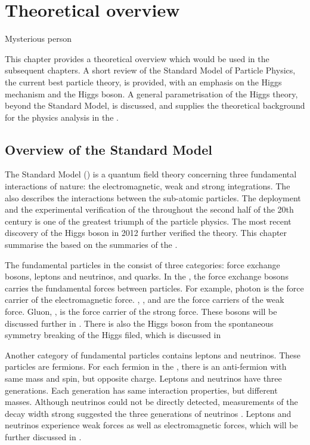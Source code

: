 \chapter{Theoretical overview}
\label{chap:Theory}

%
{Mysterious person}%

This chapter provides a theoretical overview which would be used in the subsequent  chapters. A short review of the Standard Model of Particle Physics, the current best particle theory, is provided, with an emphasis on the Higgs mechanism and the Higgs boson. A general parametrisation of the Higgs theory, beyond the Standard Model, is discussed, and supplies the theoretical background for the physics analysis in the .

\section{Overview of the Standard Model}

The Standard Model (\SM) is a quantum field theory concerning three fundamental interactions of nature: the electromagnetic, weak and strong integrations. The \SM also describes the interactions between the sub-atomic particles. The deployment and the experimental verification of the \SM throughout the second half of the 20th century is one of the greatest triumph of the particle physics. The most recent discovery of the Higgs boson in 2012 \cite{Aad:2012tfa} further verified the theory. This chapter summarise the \SM based on the summaries of the \SM \cite{Agashe:2014kda,Thomson:2013zua,Tong:QFT,Gripaios:GFT}.

The fundamental particles in the \SM consist of three categories: force exchange bosons, leptons and neutrinos, and quarks. In the \SM, the force exchange bosons carries the fundamental forces between particles. For example, photon is the force carrier of the electromagnetic force. \PWp, \PWm, and \PZ are the force carriers of the weak force. Gluon, \Pg, is the force carrier of the strong force. These bosons will be discussed further in . There is also the Higgs boson from the spontaneous symmetry breaking of the Higgs filed, which is discussed in 


Another category of fundamental particles contains leptons and neutrinos. These particles are fermions. For each fermion in the \SM, there is an anti-fermion with same mass and spin, but opposite charge. Leptons and neutrinos have three generations. Each generation has same interaction properties, but different masses. Although neutrinos could not be directly detected, measurements of the \PZ decay width strong suggested the three generations of neutrinos \cite{ALEPH:2005ab}. Leptons and neutrinos experience weak forces as well as electromagnetic forces, which will be further discussed in .

